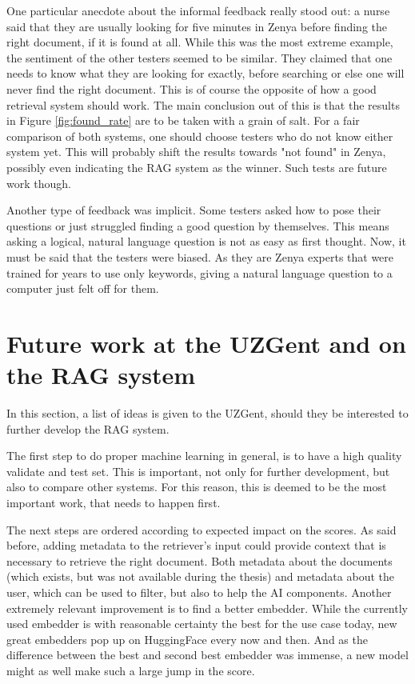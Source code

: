 One particular anecdote about the informal feedback really stood out: a nurse said that they are usually looking for five minutes in Zenya before finding the right document, if it is found at all. While this was the most extreme example, the sentiment of the other testers seemed to be similar. They claimed that one needs to know what they are looking for exactly, before searching or else one will never find the right document. This is of course the opposite of how a good retrieval system should work. The main conclusion out of this is that the results in Figure \ref{fig:found_rate} are to be taken with a grain of salt. For a fair comparison of both systems, one should choose testers who do not know either system yet. This will probably shift the results towards "not found" in Zenya, possibly even indicating the RAG system as the winner. Such tests are future work though.

Another type of feedback was implicit. Some testers asked how to pose their questions or just struggled finding a good question by themselves. This means asking a logical, natural language question is not as easy as first thought. Now, it must be said that the testers were biased. As they are Zenya experts that were trained for years to use only keywords, giving a natural language question to a computer just felt off for them.

\section{Future work at the UZGent and on the RAG system}
In this section, a list of ideas is given to the UZGent, should they be interested to further develop the RAG system.

The first step to do proper machine learning in general, is to have a high quality validate and test set. This is important, not only for further development, but also to compare other systems. For this reason, this is deemed to be the most important work, that needs to happen first.

The next steps are ordered according to expected impact on the scores. As said before, adding metadata to the retriever's input could provide context that is necessary to retrieve the right document. Both metadata about the documents (which exists, but was not available during the thesis) and metadata about the user, which can be used to filter, but also to help the AI components. Another extremely relevant improvement is to find a better embedder. While the currently used embedder is with reasonable certainty the best for the use case today, new great embedders pop up on HuggingFace every now and then. And as the difference between the best and second best embedder was immense, a new model might as well make such a large jump in the score.

